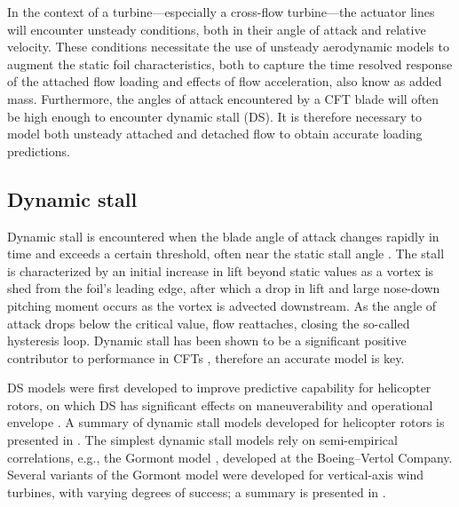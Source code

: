 In the context of a turbine---especially a cross-flow turbine---the actuator
lines will encounter unsteady conditions, both in their angle of attack and
relative velocity. These conditions necessitate the use of unsteady aerodynamic
models to augment the static foil characteristics, both to capture the time
resolved response of the attached flow loading and effects of flow acceleration,
also know as added mass. Furthermore, the angles of attack encountered by a CFT
blade will often be high enough to encounter dynamic stall (DS). It is therefore
necessary to model both unsteady attached and detached flow to obtain accurate
loading predictions.


\subsection{Dynamic stall}

Dynamic stall is encountered when the blade angle of attack changes rapidly in
time and exceeds a certain threshold, often near the static stall angle
\cite{McCroskey1981}. The stall is characterized by an initial increase in lift
beyond static values as a vortex is shed from the foil's leading edge, after
which a drop in lift and large nose-down pitching moment occurs as the vortex is
advected downstream. As the angle of attack drops below the critical value, flow
reattaches, closing the so-called hysteresis loop. Dynamic stall has been shown
to be a significant positive contributor to performance in CFTs \cite{Para2002,
    Urbina2013}, therefore an accurate model is key.

DS models were first developed to improve predictive capability for helicopter
rotors, on which DS has significant effects on maneuverability and operational
envelope \cite{Bousman2000}. A summary of dynamic stall models developed for
helicopter rotors is presented in \cite{Leishman2006}. The simplest dynamic
stall models rely on semi-empirical correlations, e.g., the Gormont model
\cite{Gormont1973}, developed at the Boeing--Vertol Company. Several variants of
the Gormont model were developed for vertical-axis wind turbines, with varying
degrees of success; a summary is presented in \cite{Para2002}.

